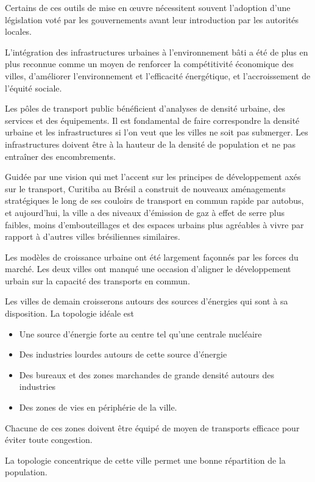 Certains de ces outils de mise en œuvre nécessitent souvent l'adoption d'une législation voté
par les gouvernements avant leur introduction par les autorités locales.

L'intégration des infrastructures urbaines à l'environnement bâti a été de plus en plus
reconnue comme un moyen de renforcer la compétitivité économique des villes, d'améliorer
l'environnement et l'efficacité énergétique, et l'accroissement de l'équité sociale.

Les pôles de transport public bénéficient d'analyses de densité urbaine,
des services et des équipements. Il est fondamental de faire correspondre la densité urbaine et
les infrastructures si l'on veut que les villes ne soit pas submerger.
Les infrastructures doivent être à la hauteur de la densité de population et ne pas entraîner des encombrements.

Guidée par une vision qui met l'accent sur les principes de développement axés sur le transport,
Curitiba au Brésil a construit de nouveaux aménagements stratégiques le long de ses couloirs de transport
en commun rapide par autobus, et aujourd'hui, la ville a des niveaux d'émission de gaz à effet de serre plus
faibles, moins d'embouteillages et des espaces urbains plus agréables à vivre par rapport à d'autres
villes brésiliennes similaires.

Les modèles de croissance urbaine ont été largement façonnés par les forces du marché. Les deux villes
ont manqué une occasion d'aligner le développement urbain sur la capacité des transports en commun.

Les villes de demain croisserons autours des sources d'énergies qui sont à sa disposition.
La topologie idéale est

\begin{itemize}
    \item Une source d'énergie forte au centre tel qu'une centrale nucléaire
    \item Des industries lourdes autours de cette source d'énergie
    \item Des bureaux et des zones marchandes de grande densité autours des industries
    \item Des zones de vies en périphérie de la ville.
\end{itemize}

Chacune de ces zones doivent être équipé de moyen de transports efficace pour
éviter toute congestion.

La topologie concentrique de cette ville permet une bonne répartition de la population.

